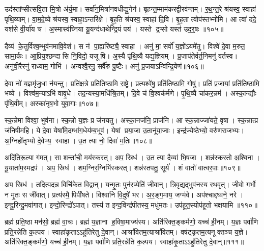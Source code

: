 उद॑स्तांप्सीत्सवि॒ता मि॒त्रो अ॑र्य॒मा। सर्वा॑न॒मित्रा॑नवधीद्यु॒गेन॑। बृ॒हन्त॒म्माम॑करद्वी॒रव॑न्तम्। र॒थ॒न्त॒रे श्र॑यस्व॒ स्वाहा॑ पृथि॒व्याम्। वा॒म॒दे॒व्ये श्र॑यस्व॒ स्वाहा॒ऽन्तरि॑क्षे। बृ॒ह॒ति श्र॑यस्व॒ स्वाहा॑ दि॒वि। बृ॒ह॒ता त्वोप॑स्तभ्नोमि। आ त्वा॑ ददे॒ यश॑से वी॒र्या॑य च। अ॒स्मास्व॑घ्निया यू॒यन्द॑धाथेन्द्रि॒यं पय॑। यस्ते द्र॒प्सो यस्त॑ उद॒र्॒षः ॥१०५॥

दैव्य॑ के॒तुर्विश्व॒म्भुव॑नमावि॒वेश॑। स न॑ पा॒ह्यरि॑ष्ट्यै॒ स्वाहा। अनु॑ मा॒ सर्वो॑ य॒ज्ञो॑ऽयमे॑तु। विश्वे॑ दे॒वा म॒रुत॒ सामा॒र्कः। आ॒प्रिय॒श्छन्दासि नि॒विदो॒ यजूषि। अ॒स्यै पृ॑थि॒व्यै यद्य॒ज्ञियम्। प्र॒जाप॑तेर्वर्त॒निमनु॑ वर्तस्व। अनु॑वी॒रैरनु॑ राध्याम॒ गोभि॑। अन्वश्वै॒रनु॒ सर्वै॑रु पु॒ष्टैः। अनु॑ प्र॒जयाऽन्वि॑न्द्रि॒येण॑॥१०६॥

दे॒वा नो॑ य॒ज्ञमृ॑जु॒धा न॑यन्तु। प्रति॑क्ष॒त्रे प्रति॑तिष्ठामि रा॒ष्ट्रे। प्रत्यश्वे॑षु॒ प्रति॑तिष्ठामि॒ गोषु॑। प्रति॑ प्र॒जायां॒ प्रति॑तिष्ठामि॒ भव्ये। विश्व॑म॒न्याऽभि॑ वावृ॒धे। तद॒न्यस्या॒मधि॑श्रि॒तम्। दि॒वे च॑ वि॒श्वक॑र्मणे। पृ॒थि॒व्यै चा॑कर॒न्नम॑। अस्का॒न्द्यौः पृ॑थि॒वीम्। अस्का॑नृष॒भो युवा॒गाः॥१०७॥

स्क॒न्नेमा विश्वा॒ भुव॑ना। स्क॒न्नो य॒ज्ञः प्र ज॑नयतु। अस्का॒नज॑नि॒ प्राज॑नि। आ स्क॒न्नाज्जा॑यते॒ वृषा। स्क॒न्नात्प्र ज॑निषीमहि। ये दे॒वा येषा॑मि॒दम्भा॑ग॒धेय॑म्ब॒भूव॑। येषां प्रया॒जा उ॒तानू॑या॒जाः। इन्द्र॑ज्येष्ठेभ्यो॒ वरु॑णराजभ्यः। अ॒ग्निहो॑तृभ्यो दे॒वेभ्य॒ स्वाहा। उ॒त त्या नो॒ दिवा॑ म॒तिः॥१०८॥

अदि॑तिरू॒त्या ग॑मत्। सा शन्ता॑ची॒ मय॑स्करत्। अप॒ स्रिध॑। उ॒त त्या दैव्या॑ भि॒षजा। शन्न॑स्करतो अ॒श्विना। यू॒याता॑म॒स्मद्रप॑। अप॒ स्रिध॑। शम॒ग्निर॒ग्निभि॑स्करत्। शन्न॑स्तपतु॒ सूर्य॑। शं वातो॑ वात्वर॒पाः॥१०९॥

अप॒ स्रिध॑। तदित्प॒दन्न विचि॑केत वि॒द्वान्। यन्मृ॒तः पुन॑र॒प्येति॑ जी॒वान्। त्रि॒वृद्यद्भुव॑नस्य रथ॒वृत्। जी॒वो गर्भो॒ न मृ॒तः स जी॑वात्। प्रत्य॑स्मै॒ पिपी॑षते। विश्वा॑नि वि॒दुषे॑ भर। अ॒र॒ङ्ग॒माय॒ जग्म॑वे। अप॑श्चाद्दघ्वने॒ नरे। इन्दु॒रिन्दु॒मवा॑गात्। इन्दो॒रिन्द्रो॑ऽपात्। तस्य॑ त इन्द॒विन्द्र॑पीतस्य॒ मधु॑मतः। उप॑हूत॒स्योप॑हूतो भक्षयामि ॥११०॥\anuvakamend[उ॒द॒र्॒ष इ॑न्द्रि॒येण॒ गा म॒तिर॑र॒पा अ॑गा॒त्रीणि॑ च]

ब्रह्म॑ प्रति॒ष्ठा मन॑सो॒ ब्रह्म॑ वा॒चः। ब्रह्म॑ य॒ज्ञाना ह॒विषा॒माज्य॑स्य। अति॑रिक्त॒ङ्कर्म॑णो॒ यच्च॑ ही॒नम्। य॒ज्ञः पर्वा॑णि प्रति॒रन्ने॑ति क॒ल्पय\sn{}। स्वाहा॑कृ॒ताऽऽहु॑तिरेतु दे॒वान्। आश्रा॑वितम॒त्याश्रा॑वितम्। वष॑ट्कृतम॒त्यनूक्तञ्च य॒ज्ञे। अति॑रिक्त॒ङ्कर्म॑णो॒ यच्च॑ ही॒नम्। य॒ज्ञः पर्वा॑णि प्रति॒रन्ने॑ति क॒ल्पय\sn{}। स्वाहा॑कृ॒ताऽऽहु॑तिरेतु दे॒वान्॥१११॥

